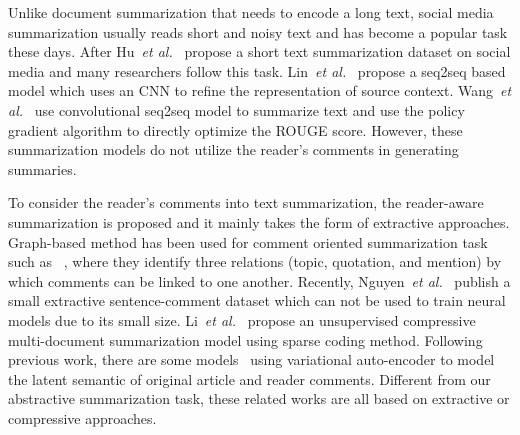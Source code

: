 \documentclass[letterpaper]{article} %
\newcommand{\etal}{\emph{et al.}\xspace}
\begin{document}
Unlike document summarization that needs to encode a long text, social media summarization usually reads short and noisy text and has become a popular task these days.
After Hu~\etal~ propose a short text summarization dataset on social media and many researchers follow this task.
Lin~\etal~ propose a seq2seq based model which uses an CNN to refine the representation of source context.
Wang~\etal~ use convolutional seq2seq model to summarize text and use the policy gradient algorithm to directly optimize the ROUGE score.
However, these summarization models do not utilize the reader's comments in generating summaries.

To consider the reader's comments into text summarization, the reader-aware summarization is proposed and it mainly takes the form of extractive approaches.
Graph-based method has been used for comment oriented summarization task such as ~\cite{Hu2007CommentsorientedBS,Hu2008CommentsorientedDS},  where they identify three relations (topic, quotation, and mention) by which comments can be linked to one another.
Recently, Nguyen~\etal~ publish a small extractive sentence-comment dataset which can not be used to train neural models due to its small size.
Li~\etal~ propose an unsupervised compressive multi-document summarization model using sparse coding method.
Following previous work, there are some models~\cite{li2017reader,Li2017SalienceEV} using variational auto-encoder to model the latent semantic of original article and reader comments.
Different from our abstractive summarization task, these related works are all based on extractive or compressive approaches.
\end{document}
